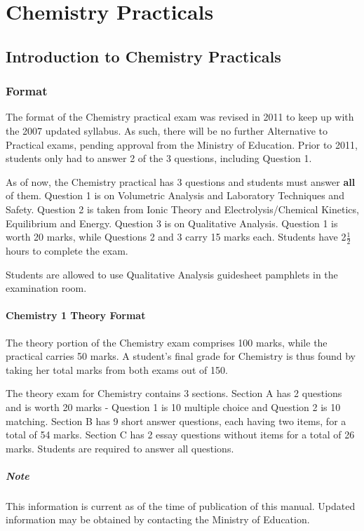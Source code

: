 \chapter{Chemistry Practicals}

\section{Introduction to Chemistry Practicals}

\subsection{Format}
The format of the Chemistry practical exam was revised in 2011 to keep up with the 2007 updated syllabus. As such, there will be no further Alternative to Practical exams, pending approval from the Ministry of Education. Prior to 2011, students only had to answer 2 of the 3 questions, including Question 1.

As of now, the Chemistry practical has 3 questions and students must answer \textbf{all} of them. Question 1 is on Volumetric Analysis and Laboratory Techniques and Safety. Question 2 is taken from Ionic Theory and Electrolysis\slash Chemical Kinetics, Equilibrium and Energy. Question 3 is on Qualitative Analysis. Question 1 is worth 20 marks, while Questions 2 and 3 carry 15 marks each. Students have 2$\frac{1}{2}$ hours to complete the exam.

Students are allowed to use Qualitative Analysis guidesheet pamphlets in the examination room.

\subsubsection{Chemistry 1 Theory Format}
The theory portion of the Chemistry exam comprises 100 marks, while the practical carries 50 marks. A student's final grade for Chemistry is thus found by taking her total marks from both exams out of 150.

The theory exam for Chemistry contains 3 sections. Section A has 2 questions and is worth 20 marks - Question 1 is 10 multiple choice and Question 2 is 10 matching. Section B has 9 short answer questions, each having two items, for a total of 54 marks. Section C has 2 essay questions without items for a total of 26 marks. Students are required to answer all questions.

\paragraph{Note} This information is current as of the time of publication of this manual. Updated information may be obtained by contacting the Ministry of Education.

